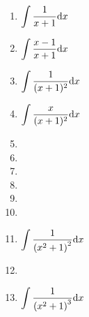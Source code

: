 
\begin{multicols}{2}
\begin{enumerate}[ref={\fcProblemRef}]
\item $\displaystyle \int \frac{1}{x+1}{\normalfont \text{d}} {}x$

\item $\displaystyle \int \frac{x-1}{x+1}{\normalfont \text{d}} {}x$

\item $\displaystyle \int \frac{ 1}{(x+1)^2}{\normalfont \text{d}} {}x$

\item $\displaystyle \int \frac{x}{(x+1)^2}{\normalfont \text{d}} {}x$

\item 
\item 
\item 

\item 
\item 
\item 
\item \label{problemint1/(x^2+1)^2dx}  $\displaystyle
\int \frac{1}{ \left(x^2+1\right)^2}{\normalfont \text{d}} x
$

\item 
\item $\displaystyle \int \frac{1}{ \left(x^2+ 1 \right)^3 }{\normalfont \text{d}} x
$

\end{enumerate}
\end{multicols}
